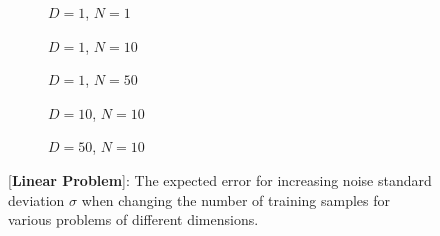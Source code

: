 \begin{figure}[!ht]
  \centering
    \begin{subfigure}{0.3\textwidth}
      \centering
      \caption{$D=1$, $N=1$}
      \label{fig:linear-std_y-N-1-D-1}
    \end{subfigure}
    \begin{subfigure}{0.3\textwidth}
      \centering
      \caption{$D=1$, $N=10$}
      \label{fig:linear-std_y-N-10-D-1}
    \end{subfigure}
    \begin{subfigure}{0.3\textwidth}
      \centering
      \caption{$D=1$, $N=50$}
      \label{fig:linear-std_y-N-50-D-1}
    \end{subfigure}

    \begin{subfigure}{0.3\textwidth}
      \centering
      \caption{$D=10$, $N=10$}
      \label{fig:linear-std_y-N-10-D-10}
    \end{subfigure}
    \begin{subfigure}{0.3\textwidth}
      \centering
      \caption{$D=50$, $N=10$}
      \label{fig:linear-std_y-N-10-D-50}
    \end{subfigure}  

  \caption{[\textbf{Linear Problem}]: The expected error for increasing noise standard deviation $\sigma$  when changing the number of training samples for various problems of different dimensions.}
  \label{fig:linear-std_y}
\end{figure}

